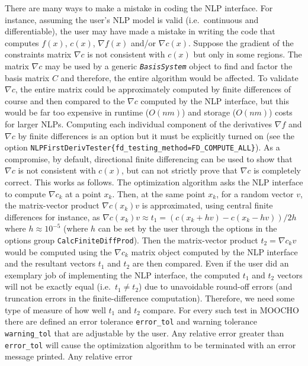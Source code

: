 \documentclass[pdf,12pt,report]{SANDreport}
\begin{document}
There are many ways to make a mistake in coding the NLP interface.  For
instance, assuming the user's NLP model is valid (i.e.~continuous and
differentiable), the user may have made a mistake in writing the code that
computes $f(x)$, $c(x)$, $\nabla f(x)$ and/or $\nabla c(x)$.  Suppose the
gradient of the constraints matrix $\nabla c$ is not consistent with $c(x)$
but only in some regions.  The matrix $\nabla c$ may be used by a generic
{}\texttt{\textit{Basis\-System}} object to find and factor the basis matrix
$C$ and therefore, the entire algorithm would be affected.  To validate
$\nabla c$, the entire matrix could be approximately computed by finite
differences of course and then compared to the $\nabla c$ computed by the NLP
interface, but this would be far too expensive in runtime ($O(n m)$) and
storage ($O(n m)$) costs for larger NLPs.  Computing each individual component
of the derivatives $\nabla f$ and $\nabla c$ by finite differences is an
option but it must be explicitly turned on (see the option
{}\texttt{NLP\-First\-Deriv\-Tester\{\-fd\-\_testing\-\_method\-=FD\-\_COMPUTE\-\_ALL\-\}}).
As a compromise, by default, directional finite differencing can be used to
show that $\nabla c$ is not consistent with $c(x)$, but can not strictly prove
that $\nabla c$ is completely correct.  This works as follows.  The
optimization algorithm asks the NLP interface to compute $\nabla c_k$ at a
point $x_k$.  Then, at the same point $x_k$, for a random vector $v$, the
matrix-vector product $\nabla c(x_k) v$ is approximated, using central finite
differences for instance, as $\nabla c(x_k) v \approx t_1 = ( c(x_k + h v) -
c(x_k - h v) ) / 2 h$ where $h \approx 10^{-5}$ (where $h$ can be set by the
user through the options in the options group
{}\texttt{Calc\-Finite\-Diff\-Prod}).  Then the matrix-vector product $t_2 =
\nabla c_k v$ would be computed using the $\nabla c_k$ matrix object computed
by the NLP interface and the resultant vectors $t_1$ and $t_2$ are then
compared.  Even if the user did an exemplary job of implementing the NLP
interface, the computed $t_1$ and $t_2$ vectors will not be exactly equal
(i.e.~$t_1 \neq t_2$) due to unavoidable round-off errors (and truncation
errors in the finite-difference computation).  Therefore, we need some type of
measure of how well $t_1$ and $t_2$ compare.  For every such test in MOOCHO
there are defined an error tolerance {}\texttt{error\_tol} and warning
tolerance {}\texttt{warning\_tol} that are adjustable by the user.  Any
relative error greater than {}\texttt{error\_tol} will cause the optimization
algorithm to be terminated with an error message printed.  Any relative error
\end{document}
